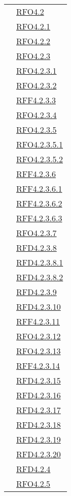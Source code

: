 \begin{longtable}{|>{\centering}m{5cm}|m{5cm}<{\centering}|}
& \hyperlink{RFO4.2}{RFO4.2}\\
& \hyperlink{RFO4.2.1}{RFO4.2.1}\\
& \hyperlink{RFO4.2.2}{RFO4.2.2}\\
& \hyperlink{RFO4.2.3}{RFO4.2.3}\\
& \hyperlink{RFO4.2.3.1}{RFO4.2.3.1}\\
& \hyperlink{RFO4.2.3.2}{RFO4.2.3.2}\\
& \hyperlink{RFF4.2.3.3}{RFF4.2.3.3}\\
& \hyperlink{RFO4.2.3.4}{RFO4.2.3.4}\\
& \hyperlink{RFO4.2.3.5}{RFO4.2.3.5}\\
& \hyperlink{RFO4.2.3.5.1}{RFO4.2.3.5.1}\\
& \hyperlink{RFO4.2.3.5.2}{RFO4.2.3.5.2}\\
& \hyperlink{RFF4.2.3.6}{RFF4.2.3.6}\\
& \hyperlink{RFF4.2.3.6.1}{RFF4.2.3.6.1}\\
& \hyperlink{RFF4.2.3.6.2}{RFF4.2.3.6.2}\\
& \hyperlink{RFF4.2.3.6.3}{RFF4.2.3.6.3}\\
& \hyperlink{RFO4.2.3.7}{RFO4.2.3.7}\\
& \hyperlink{RFD4.2.3.8}{RFD4.2.3.8}\\
& \hyperlink{RFD4.2.3.8.1}{RFD4.2.3.8.1}\\
& \hyperlink{RFD4.2.3.8.2}{RFD4.2.3.8.2}\\
& \hyperlink{RFD4.2.3.9}{RFD4.2.3.9}\\
& \hyperlink{RFD4.2.3.10}{RFD4.2.3.10}\\
& \hyperlink{RFF4.2.3.11}{RFF4.2.3.11}\\
& \hyperlink{RFO4.2.3.12}{RFO4.2.3.12}\\
& \hyperlink{RFO4.2.3.13}{RFO4.2.3.13}\\
& \hyperlink{RFF4.2.3.14}{RFF4.2.3.14}\\
& \hyperlink{RFD4.2.3.15}{RFD4.2.3.15}\\
& \hyperlink{RFD4.2.3.16}{RFD4.2.3.16}\\
& \hyperlink{RFD4.2.3.17}{RFD4.2.3.17}\\
& \hyperlink{RFD4.2.3.18}{RFD4.2.3.18}\\
& \hyperlink{RFD4.2.3.19}{RFD4.2.3.19}\\
& \hyperlink{RFD4.2.3.20}{RFD4.2.3.20}\\
& \hyperlink{RFD4.2.4}{RFD4.2.4}\\
& \hyperlink{RFO4.2.5}{RFO4.2.5}\\

\end{longtable}
